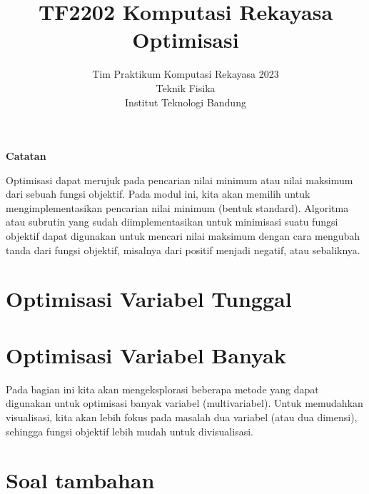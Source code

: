 



\title{%
{\small TF2202 Komputasi Rekayasa}\\
Optimisasi
}
\author{Tim Praktikum Komputasi Rekayasa 2023\\
Teknik Fisika\\
Institut Teknologi Bandung}
\date{}
\maketitle

\textbf{Catatan}

Optimisasi dapat merujuk pada pencarian nilai minimum atau nilai maksimum
dari sebuah fungsi objektif.
Pada modul ini, kita akan memilih untuk mengimplementasikan
pencarian nilai minimum (bentuk standard).
Algoritma atau subrutin yang sudah diimplementasikan
untuk minimisasi suatu fungsi objektif dapat digunakan untuk mencari nilai maksimum
dengan cara mengubah tanda dari fungsi objektif, misalnya dari positif menjadi negatif,
atau sebaliknya.


\section{Optimisasi Variabel Tunggal}
%





\section{Optimisasi Variabel Banyak}
Pada bagian ini kita akan mengeksplorasi beberapa metode yang dapat
digunakan untuk optimisasi banyak variabel (multivariabel). Untuk
memudahkan visualisasi, kita akan lebih fokus pada masalah dua variabel
(atau dua dimensi), sehingga fungsi objektif lebih mudah untuk divisualisasi.








\section{Soal tambahan}







